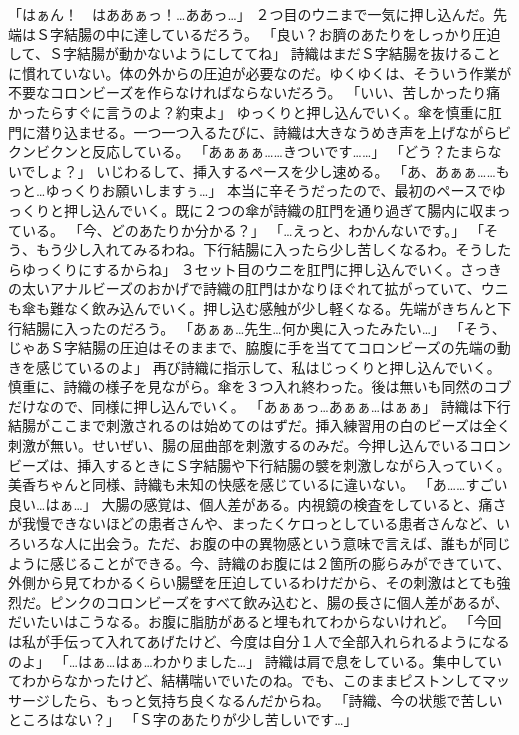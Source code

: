 「はぁん！　はああぁっ！…ああっ…」
２つ目のウニまで一気に押し込んだ。先端はＳ字結腸の中に達しているだろう。
「良い？お臍のあたりをしっかり圧迫して、Ｓ字結腸が動かないようにしててね」
詩織はまだＳ字結腸を抜けることに慣れていない。体の外からの圧迫が必要なのだ。ゆくゆくは、そういう作業が不要なコロンビーズを作らなければならないだろう。
「いい、苦しかったり痛かったらすぐに言うのよ？約束よ」
ゆっくりと押し込んでいく。傘を慎重に肛門に潜り込ませる。一つ一つ入るたびに、詩織は大きなうめき声を上げながらビクンビクンと反応している。
「あぁぁぁ……きついです……」
「どう？たまらないでしょ？」
いじわるして、挿入するペースを少し速める。
「あ、あぁぁ……もっと…ゆっくりお願いしますぅ…」
本当に辛そうだったので、最初のペースでゆっくりと押し込んでいく。既に２つの傘が詩織の肛門を通り過ぎて腸内に収まっている。
「今、どのあたりか分かる？」
「…えっと、わかんないです。」
「そう、もう少し入れてみるわね。下行結腸に入ったら少し苦しくなるわ。そうしたらゆっくりにするからね」
３セット目のウニを肛門に押し込んでいく。さっきの太いアナルビーズのおかげで詩織の肛門はかなりほぐれて拡がっていて、ウニも傘も難なく飲み込んでいく。押し込む感触が少し軽くなる。先端がきちんと下行結腸に入ったのだろう。
「あぁぁ…先生…何か奥に入ったみたい…」
「そう、じゃあＳ字結腸の圧迫はそのままで、脇腹に手を当ててコロンビーズの先端の動きを感じているのよ」
再び詩織に指示して、私はじっくりと押し込んでいく。慎重に、詩織の様子を見ながら。傘を３つ入れ終わった。後は無いも同然のコブだけなので、同様に押し込んでいく。
「あぁぁっ…あぁぁ…はぁぁ」
詩織は下行結腸がここまで刺激されるのは始めてのはずだ。挿入練習用の白のビーズは全く刺激が無い。せいぜい、腸の屈曲部を刺激するのみだ。今押し込んでいるコロンビーズは、挿入するときにＳ字結腸や下行結腸の襞を刺激しながら入っていく。美香ちゃんと同様、詩織も未知の快感を感じているに違いない。
「あ……すごい良い…はぁ…」
大腸の感覚は、個人差がある。内視鏡の検査をしていると、痛さが我慢できないほどの患者さんや、まったくケロっとしている患者さんなど、いろいろな人に出会う。ただ、お腹の中の異物感という意味で言えば、誰もが同じように感じることができる。今、詩織のお腹には２箇所の膨らみができていて、外側から見てわかるくらい腸壁を圧迫しているわけだから、その刺激はとても強烈だ。ピンクのコロンビーズをすべて飲み込むと、腸の長さに個人差があるが、だいたいはこうなる。お腹に脂肪があると埋もれてわからないけれど。
「今回は私が手伝って入れてあげたけど、今度は自分１人で全部入れられるようになるのよ」
「…はぁ…はぁ…わかりました…」
詩織は肩で息をしている。集中していてわからなかったけど、結構喘いでいたのね。でも、このままピストンしてマッサージしたら、もっと気持ち良くなるんだからね。
「詩織、今の状態で苦しいところはない？」
「Ｓ字のあたりが少し苦しいです…」
